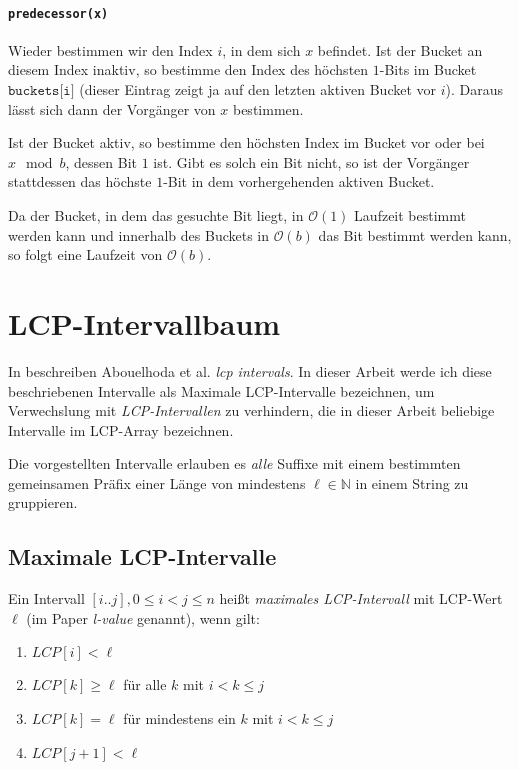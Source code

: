\paragraph{\texttt{predecessor(x)}}

Wieder bestimmen wir den Index $i$, in dem sich $x$ befindet. Ist der Bucket an diesem Index inaktiv, so bestimme den Index des höchsten $1$-Bits im Bucket $\texttt{buckets[i]}$ (dieser Eintrag zeigt ja auf den letzten aktiven Bucket vor $i$). Daraus lässt sich dann der Vorgänger von $x$ bestimmen.

Ist der Bucket aktiv, so bestimme den höchsten Index im Bucket vor oder bei $x \mod b$, dessen Bit $1$ ist. Gibt es solch ein Bit nicht, so ist der Vorgänger stattdessen das höchste $1$-Bit in dem vorhergehenden aktiven Bucket.

Da der Bucket, in dem das gesuchte Bit liegt, in $\mathcal{O}(1)$ Laufzeit bestimmt werden kann und innerhalb des Buckets in $\mathcal{O}(b)$ das Bit bestimmt werden kann, so folgt eine Laufzeit von $\mathcal{O}(b)$.

\section{LCP-Intervallbaum}
\label{lcpintervals}

In \cite{abouelhoda_optimal_2002} beschreiben Abouelhoda et al. \textit{lcp intervals}. In dieser Arbeit werde ich diese beschriebenen Intervalle als Maximale LCP-Intervalle bezeichnen, um Verwechslung mit \textit{LCP-Intervallen} zu verhindern, die in dieser Arbeit beliebige Intervalle im LCP-Array bezeichnen.

Die vorgestellten Intervalle erlauben es \emph{alle} Suffixe mit einem bestimmten gemeinsamen Präfix einer Länge von mindestens $\ell \in \mathbb{N}$ in einem String zu gruppieren.

\subsection{Maximale LCP-Intervalle}
\label{maxlcpint}

Ein Intervall $[i..j], 0 \leq i < j \leq n$ heißt \textit{maximales LCP-Intervall} mit LCP-Wert $\ell$ (im Paper \textit{l-value} genannt), wenn gilt:

\begin{enumerate}
	\item $LCP[i] < \ell$
	\item $LCP[k] \geq \ell$ für alle $k$ mit $i < k \leq j$
	\item $LCP[k] = \ell$ für mindestens ein $k$ mit $i < k \leq j$
	\item $LCP[j + 1] < \ell$
\end{enumerate}

